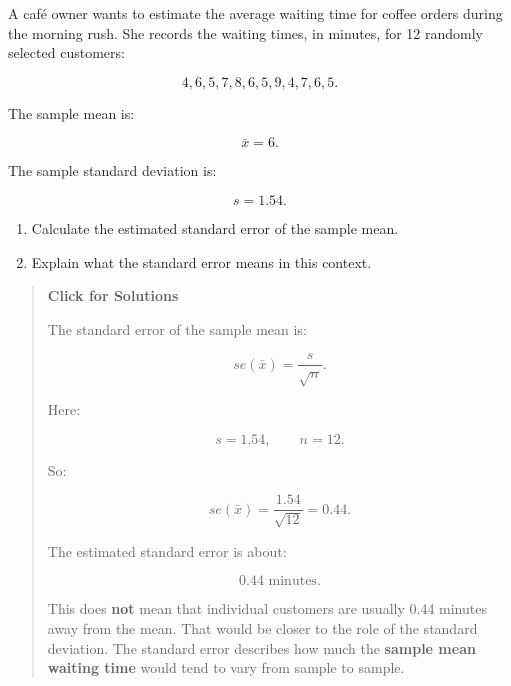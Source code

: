 \documentclass[
  letterpaper,
  DIV=11,
  numbers=noendperiod]{scrreprt}
\providecommand{\tightlist}{%
  \setlength{\itemsep}{0pt}\setlength{\parskip}{0pt}}
\begin{document}
\begin{tcolorbox}[enhanced jigsaw, arc=.35mm, bottomrule=.15mm, bottomtitle=1mm, breakable, colback=white, colbacktitle=quarto-callout-note-color!10!white, colframe=quarto-callout-note-color-frame, coltitle=black, left=2mm, leftrule=.75mm, opacityback=0, opacitybacktitle=0.6, rightrule=.15mm, title=\textcolor{quarto-callout-note-color}{\faInfo}\hspace{0.5em}{Question 3}, titlerule=0mm, toprule=.15mm, toptitle=1mm]

A café owner wants to estimate the average waiting time for coffee
orders during the morning rush. She records the waiting times, in
minutes, for 12 randomly selected customers:

\[
4,
6,
5,
7,
8,
6,
5,
9,
4,
7,
6,
5.
\]

The sample mean is:

\[
\bar{x}=6.
\]

The sample standard deviation is:

\[
s=1.54.
\]

\begin{enumerate}
\def\labelenumi{\arabic{enumi}.}
\tightlist
\item
  Calculate the estimated standard error of the sample mean.
\item
  Explain what the standard error means in this context.
\end{enumerate}

\begin{quote}
\textbf{Click for Solutions}

The standard error of the sample mean is:

\[
se(\bar{x})
=
\frac{s}{\sqrt{n}}.
\]

Here:

\[
s=1.54,
\qquad
n=12.
\]

So:

\[
se(\bar{x})
=
\frac{1.54}{\sqrt{12}}
=
0.44.
\]

The estimated standard error is about:

\[
0.44 \text{ minutes}.
\]

This does \textbf{not} mean that individual customers are usually 0.44
minutes away from the mean. That would be closer to the role of the
standard deviation. The standard error describes how much the
\textbf{sample mean waiting time} would tend to vary from sample to
sample.
\end{quote}

\end{tcolorbox}
\end{document}
